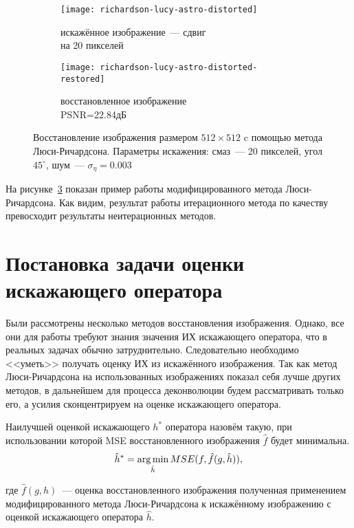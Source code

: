 \begin{figure}[h!]
	\begin{subfigure}[b]{0.5\textwidth}
		\texttt{[image: richardson-lucy-astro-distorted]}
		\caption{искажённое изображение~--- сдвиг \\на 20 пикселей}
		\label{fig:astroLucyBlurred}
	\end{subfigure}%
	\begin{subfigure}[b]{0.5\textwidth}
		\texttt{[image: richardson-lucy-astro-distorted-restored]}
		\caption{восстановленное изображение\\ PSNR=22.84дБ}
		\label{fig:astroLucyRestored}
	\end{subfigure}%
	\caption{Восстановление изображения размером $512\times 512$ c помощью метода Люси-Ричардсона. Параметры искажения: смаз~--- 20 пикселей, угол $45^\circ$, шум~--- $\sigma_\eta=0.003$}
	\label{fig:richardsonLucy}
\end{figure}
На рисунке~\ref{fig:richardsonLucy} показан пример работы модифицированного метода Люси-Ричардсона. Как видим, результат работы итерационного метода по качеству превосходит результаты неитерационных методов.


\begin{comment}
\subsection{Слепая деконволюция}
\end{comment}

\section{Постановка задачи оценки искажающего оператора}
Были рассмотрены несколько методов восстановления изображения. Однако, все они для работы требуют знания значения ИХ искажающего оператора, что в реальных задачах обычно затруднительно. Следовательно необходимо  <<уметь>> получать оценку ИХ из искажённого изображения. Так как метод Люси-Ричардсона на использованных изображениях показал себя лучше других методов, в дальнейшем для процесса деконволюции будем рассматривать только его, а усилия сконцентрируем на оценке искажающего оператора.
\begin{definition}\label{def:bestPsfEstimaton}
	Наилучшей оценкой искажающего $h^*$ оператора назовём такую, при использовании которой MSE восстановленного изображения $\hat{f}$ будет минимальна.
	\begin{equation}\label{eq:bestPsf}
	\hat{h}^* = \operatorname*{arg\,min}_{\hat{h}}MSE(f, \hat{f}(g,\hat{h})),
	\end{equation}
\end{definition}
где $\hat{f}(g,h)$~--- оценка восстановленного изображения полученная применением модифицированного метода Люси-Ричардсона к искажённому изображению с оценкой искажающего оператора $\hat{h}$. 
